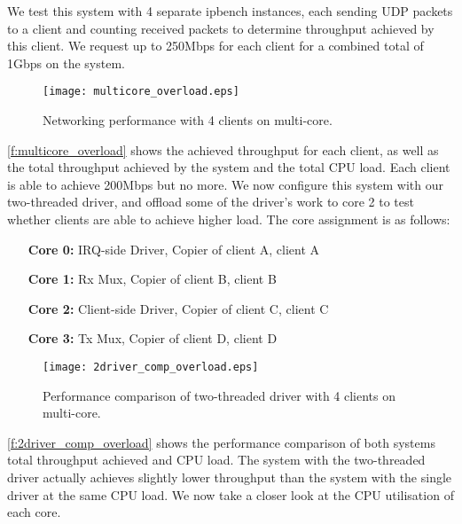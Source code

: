 We test this system with 4 separate ipbench instances, each sending UDP packets to a client and counting received packets
to determine throughput achieved by this client. We request up to 250Mbps for each client for a combined total of 1Gbps on the system.

\begin{figure}[h]
    \centering
    \texttt{[image: multicore\_overload.eps]}
    \caption{Networking performance with 4 clients on multi-core.}
    \label{f:multicore_overload}
\end{figure}

\autoref{f:multicore_overload} shows the achieved throughput for each client, as well as the total throughput achieved 
by the system and the total CPU load. Each client is able to achieve 200Mbps but no more. We now configure this system 
with our two-threaded driver, and offload some of the driver's work to core 2 to test whether clients are able to 
achieve higher load. The core assignment is as follows:

\begin{itemize}
    \item[      \textbf{Core 0:}] IRQ-side Driver, Copier of client A, client A
    \item[      \textbf{Core 1:}] Rx Mux, Copier of client B, client B
    \item[      \textbf{Core 2:}] Client-side Driver, Copier of client C, client C
    \item[      \textbf{Core 3:}] Tx Mux, Copier of client D, client D
\end{itemize}

\begin{figure}[h]
    \centering
    \texttt{[image: 2driver\_comp\_overload.eps]}
    \caption{Performance comparison of two-threaded driver with 4 clients on multi-core.}
    \label{f:2driver_comp_overload}
\end{figure}

\autoref{f:2driver_comp_overload} shows the performance comparison of both systems total throughput achieved and CPU load. 
The system with the two-threaded driver actually achieves slightly lower throughput than the system with the single driver
at the same CPU load. We now take a closer look at the CPU utilisation of each core.

